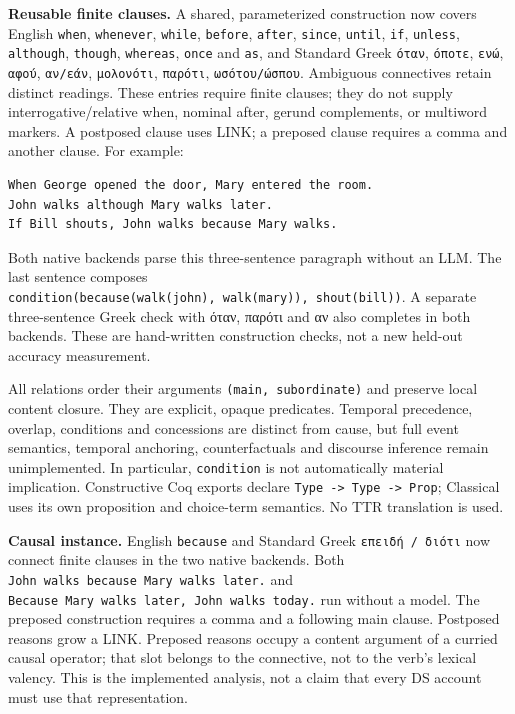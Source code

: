 \documentclass[11pt,a4paper]{article}
\begin{document}
\textbf{Reusable finite clauses.} A shared, parameterized construction
now covers English \texttt{when}, \texttt{whenever}, \texttt{while},
\texttt{before}, \texttt{after}, \texttt{since}, \texttt{until},
\texttt{if}, \texttt{unless}, \texttt{although}, \texttt{though},
\texttt{whereas}, \texttt{once} and \texttt{as}, and Standard Greek
\texttt{όταν}, \texttt{όποτε}, \texttt{ενώ}, \texttt{αφού},
\texttt{αν/εάν}, \texttt{μολονότι}, \texttt{παρότι},
\texttt{ωσότου/ώσπου}. Ambiguous connectives retain distinct readings.
These entries require finite clauses; they do not supply
interrogative/relative when, nominal after, gerund complements, or
multiword markers. A postposed clause uses LINK; a preposed clause
requires a comma and another clause. For example:

\begin{Verbatim}[fontsize=\small,breaklines=true,breakanywhere=true,commandchars=\\\{\},frame=single,rulecolor=\color{DSmuted},framesep=5pt]
When George opened the door, Mary entered the room.
John walks although Mary walks later.
If Bill shouts, John walks because Mary walks.
\end{Verbatim}

Both native backends parse this three-sentence paragraph without an LLM.
The last sentence composes
\texttt{condition(because(walk(john),\ walk(mary)),\ shout(bill))}. A
separate three-sentence Greek check with όταν, παρότι and αν also
completes in both backends. These are hand-written construction checks,
not a new held-out accuracy measurement.

All relations order their arguments \texttt{(main,\ subordinate)} and
preserve local content closure. They are explicit, opaque predicates.
Temporal precedence, overlap, conditions and concessions are distinct
from cause, but full event semantics, temporal anchoring,
counterfactuals and discourse inference remain unimplemented. In
particular, \texttt{condition} is not automatically material
implication. Constructive Coq exports declare
\texttt{Type\ -\textgreater{}\ Type\ -\textgreater{}\ Prop}; Classical
uses its own proposition and choice-term semantics. No TTR translation
is used.

\textbf{Causal instance.} English \texttt{because} and Standard Greek
\texttt{επειδή\ /\ διότι} now connect finite clauses in the two native
backends. Both \texttt{John\ walks\ because\ Mary\ walks\ later.} and
\texttt{Because\ Mary\ walks\ later,\ John\ walks\ today.} run without a
model. The preposed construction requires a comma and a following main
clause. Postposed reasons grow a LINK. Preposed reasons occupy a content
argument of a curried causal operator; that slot belongs to the
connective, not to the verb's lexical valency. This is the implemented
analysis, not a claim that every DS account must use that
representation.
\end{document}
